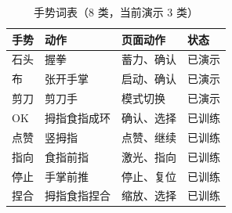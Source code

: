 \documentclass[UTF8,a4paper,12pt,fontset=none,scheme=plain]{ctexart}
\newenvironment{tighttable}{\begingroup\setstretch{1}\fontsize{9}{12}\selectfont\setlength{\tabcolsep}{2pt}}{\endgroup}
\begin{document}
\begin{table}[H]
\centering
\caption{手势词表（8 类，当前演示 3 类）}
\label{tab:gesture-vocab}
\begin{tighttable}
\begin{tabularx}{\linewidth}{@{}P{2.2cm}P{3.2cm}P{3.8cm}X@{}}
\toprule
手势 & 动作 & 页面动作 & 状态 \\
\midrule
石头 & 握拳 & 蓄力、确认 & 已演示 \\
布 & 张开手掌 & 启动、确认 & 已演示 \\
剪刀 & 剪刀手 & 模式切换 & 已演示 \\
OK & 拇指食指成环 & 确认、选择 & 已训练 \\
点赞 & 竖拇指 & 点赞、继续 & 已训练 \\
指向 & 食指前指 & 激光、指向 & 已训练 \\
停止 & 手掌前推 & 停止、复位 & 已训练 \\
捏合 & 拇指食指捏合 & 缩放、选择 & 已训练 \\
\bottomrule
\end{tabularx}
\end{tighttable}
\end{table}
\end{document}
